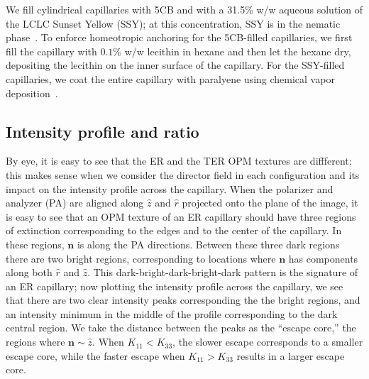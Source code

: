 We fill cylindrical capillaries with 5CB and with a 31.5\% w/w aqueous solution of the LCLC Sunset Yellow (SSY); at this concentration, SSY is in the nematic phase~\cite{RN303}.
To enforce homeotropic anchoring for the 5CB-filled capillaries, we first fill the capillary with $0.1\%$ w/w lecithin in hexane and then let the hexane dry, depositing the lecithin on the inner surface of the capillary.
For the SSY-filled capillaries, we coat the entire capillary with paralyene using chemical vapor deposition~\cite{RN192}.


\subsection{Intensity profile and ratio}
By eye, it is easy to see that the ER and the TER OPM textures are diffferent; this makes sense when we consider the director field in each configuration and its impact on the intensity profile across the capillary.
When the polarizer and analyzer (PA) are aligned along $\hat{z}$ and $\hat{r}$ projected onto the plane of the image, it is easy to see that an OPM texture of an ER capillary should have three regions of extinction corresponding to the edges and  to the center of the capillary.
In these regions, $\mathbf{n}$ is along the PA directions.
Between these three dark regions there are two bright regions, corresponding to locations where $\mathbf{n}$ has components along both $\hat{r}$ and $\hat{z}$.
This dark-bright-dark-bright-dark pattern is the signature of an ER capillary; now plotting the intensity profile across the capillary, we see that there are two clear intensity peaks corresponding the the bright regions, and an intensity minimum in the middle of the profile corresponding to the dark central region.
We take the distance between the peaks as the ``escape core,'' the regions where $\mathbf{n} \sim \hat{z}$.
When $K_{11} < K_{33}$, the slower escape corresponds to a smaller escape core, while the faster escape when $K_{11} > K_{33}$ results in a larger escape core.

